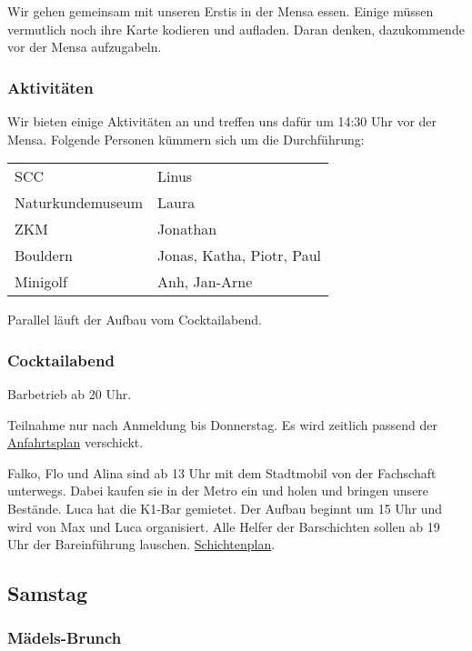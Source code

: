 \documentclass[10pt,ngerman]{scrartcl}
\begin{document}
\begin{multicols}{2}
Wir gehen gemeinsam mit unseren Erstis in der Mensa essen.
Einige müssen vermutlich noch ihre Karte kodieren und aufladen.
Daran denken, dazukommende vor der Mensa aufzugabeln.

\subsubsection{Aktivitäten}

Wir bieten einige Aktivitäten an und treffen uns dafür um 14:30 Uhr vor der Mensa.
Folgende Personen kümmern sich um die Durchführung:

\begin{tabular}[H]{ll}
    SCC & Linus \\
    Naturkundemuseum & Laura \\
    ZKM & Jonathan \\
    Bouldern & Jonas, Katha, Piotr, Paul \\
    Minigolf & Anh, Jan-Arne \\
\end{tabular}

Parallel läuft der Aufbau vom Cocktailabend.

\subsubsection{Cocktailabend}

Barbetrieb ab 20 Uhr.

Teilnahme nur nach Anmeldung bis Donnerstag.
Es wird zeitlich passend der \href{https://discord.com/channels/739522765677133894/963505261388107846/1030438323086438440}{Anfahrtsplan} verschickt.

Falko, Flo und Alina sind ab 13 Uhr mit dem Stadtmobil von der Fachschaft unterwegs.
Dabei kaufen sie in der Metro ein und holen und bringen unsere Bestände.
Luca hat die K1-Bar gemietet.
Der Aufbau beginnt um 15 Uhr und wird von Max und Luca organisiert.
Alle Helfer der Barschichten sollen ab 19 Uhr der Bareinführung lauschen.
\href{https://docs.google.com/spreadsheets/d/17ycbRMmSfck2oAsiZ9djPUULAgf4-vCJ6Q4EXgZmB0g/edit?usp=sharing}{Schichtenplan}.



\subsection{Samstag}

\subsubsection{Mädels-Brunch}


\end{multicols}
\end{document}

